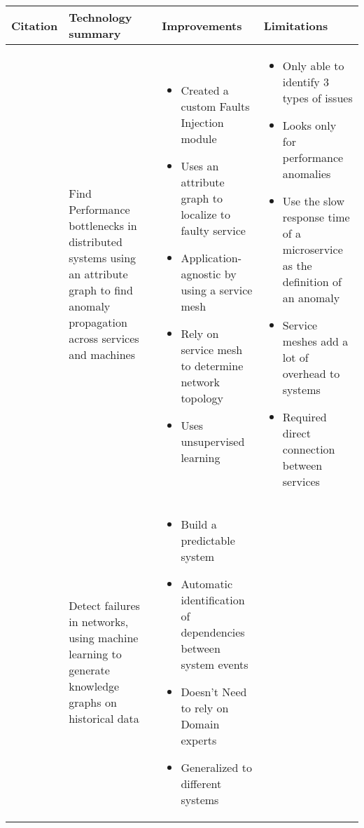 \begin{longtable}{| p{2cm} | p{4cm} | p{4.5cm} | p{4.5cm} |}
\hline
  \textbf{Citation} &
  \textbf{Technology summary} &
  \textbf{Improvements} &
  \textbf{Limitations} \\ \hline
  \cite{wu2020microrca} &
  Find Performance bottlenecks in distributed systems using an attribute graph to find anomaly propagation across services and machines &
  \vspace{-8mm}
  \begin{itemize}[leftmargin=*,noitemsep,nolistsep] 
    \item Created a custom Faults Injection module
    \item Uses an attribute graph to localize to faulty service
    \item Application-agnostic by using a service mesh
    \item Rely on service mesh to determine network topology
    \item Uses unsupervised learning
  \end{itemize} &
  \vspace{-8mm}
  \begin{itemize}[leftmargin=*,noitemsep,nolistsep] 
    \item Only able to identify 3 types of issues
    \item Looks only for performance anomalies
    \item Use the slow response time of a microservice as the definition of an anomaly
    \item Service meshes add a lot of overhead to systems
    \item Required direct connection between services
  \end{itemize} \\ \hline
  \cite{gonzalez2017root} &
  Detect failures in networks, using machine learning to generate knowledge graphs on historical data &
  \vspace{-8mm}
  \begin{itemize}[leftmargin=*,noitemsep,nolistsep] 
    \item Build a predictable system
    \item Automatic identification of dependencies between system events
    \item Doesn't Need to rely on Domain experts
    \item Generalized to different systems
  \end{itemize} &
  \vspace{-8mm}

\end{longtable}
